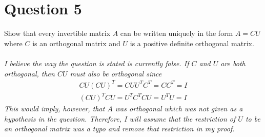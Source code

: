 \documentclass[10pt,a4paper]{article}
\theoremstyle{definition}
\theoremstyle{definition}
\numberwithin{equation}{section}
\begin{document}
\section*{Question 5}
Show that every invertible matrix $A$ can be written uniquely in the form $A = CU$ where $C$ is an orthogonal matrix and $U$ is a positive definite orthogonal matrix. 
\\
\\\emph{I believe the way the question is stated is currently false. If $C$ and $U$ are both orthogonal, then $CU$ must also be orthogonal since 
\begin{align*}
CU(CU)^T = CUU^TC^T = CC^T = I\\
(CU)^TCU = U^TC^TCU = U^TU = I
\end{align*}
This would imply, however, that $A$ was orthogonal which was not given as a hypothesis in the question. Therefore, I will assume that the restriction of $U$ to be an orthogonal matrix was a typo and remove that restriction in my proof.}
\end{document}
